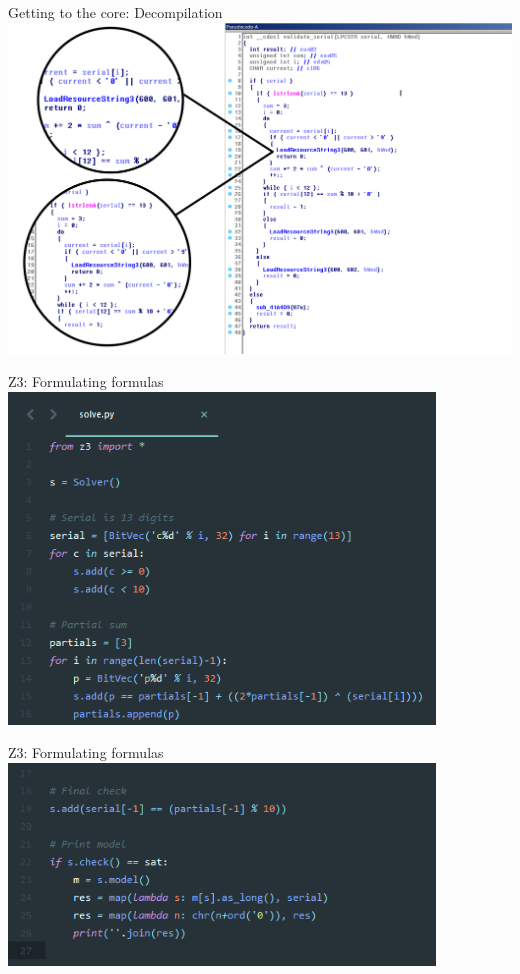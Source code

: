\documentclass[10pt, compress]{beamer}
\begin{document}
\begin{frame}{Getting to the core: Decompilation}
	\includegraphics[width=\textwidth]{images/sc1-4-validator-rev-zoom.png}
\end{frame}

\begin{frame}{Z3: Formulating formulas}
	\includegraphics[width=0.85\textwidth]{images/sc1-6-z3-1.png}
\end{frame}

\begin{frame}{Z3: Formulating formulas}
	\includegraphics[width=0.85\textwidth]{images/sc1-6-z3-2.png}
\end{frame}
\end{document}
